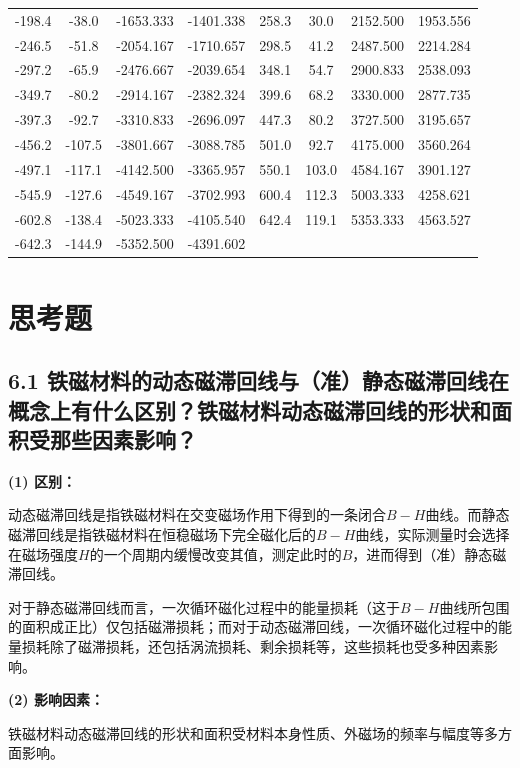 \documentclass[UTF8]{article}
\theoremstyle{MyLineTheoremStyle} %
\theoremstyle{MyBlockTheoremStyle} %
\theoremstyle{MySubsubsectionStyle} %
\begin{document}
\begin{table}[H]
\begin{tabular}{|cccc|cccc|}
        -198.4	&-38.0	&-1653.333	&-1401.338	& 258.3	&30.0	&2152.500	&1953.556  \\
        -246.5	&-51.8	&-2054.167	&-1710.657	& 298.5	&41.2	&2487.500	&2214.284  \\
        -297.2	&-65.9	&-2476.667	&-2039.654	& 348.1	&54.7	&2900.833	&2538.093  \\
        -349.7	&-80.2	&-2914.167	&-2382.324	& 399.6	&68.2	&3330.000	&2877.735  \\
        -397.3	&-92.7	&-3310.833	&-2696.097	& 447.3	&80.2	&3727.500	&3195.657  \\
        -456.2	&-107.5	&-3801.667	&-3088.785	& 501.0	&92.7	&4175.000	&3560.264  \\
        -497.1	&-117.1	&-4142.500	&-3365.957	& 550.1	&103.0	&4584.167	&3901.127  \\
        -545.9	&-127.6	&-4549.167	&-3702.993	& 600.4	&112.3	&5003.333	&4258.621  \\
        -602.8	&-138.4	&-5023.333	&-4105.540	& 642.4	&119.1	&5353.333	&4563.527  \\
        -642.3	&-144.9	&-5352.500	&-4391.602	& 		&	& & \\
        \hline
    \end{tabular}
\end{table}

\section{思考题}

\subsection*{6.1 铁磁材料的动态磁滞回线与（准）静态磁滞回线在概念上有什么区别？铁磁材料动态磁滞回线的形状和面积受那些因素影响？}


\noindent \textbf{(1) 区别：}

动态磁滞回线是指铁磁材料在交变磁场作用下得到的一条闭合$ B-H $曲线。而静态磁滞回线是指铁磁材料在恒稳磁场下完全磁化后的$ B-H $曲线，实际测量时会选择在磁场强度$ H $的一个周期内缓慢改变其值，测定此时的$ B $，进而得到（准）静态磁滞回线。

对于静态磁滞回线而言，一次循环磁化过程中的能量损耗（这于$ B-H $曲线所包围的面积成正比）仅包括磁滞损耗；而对于动态磁滞回线，一次循环磁化过程中的能量损耗除了磁滞损耗，还包括涡流损耗、剩余损耗等，这些损耗也受多种因素影响。

\noindent \textbf{(2) 影响因素：}

铁磁材料动态磁滞回线的形状和面积受材料本身性质、外磁场的频率与幅度等多方面影响。
\end{document}
